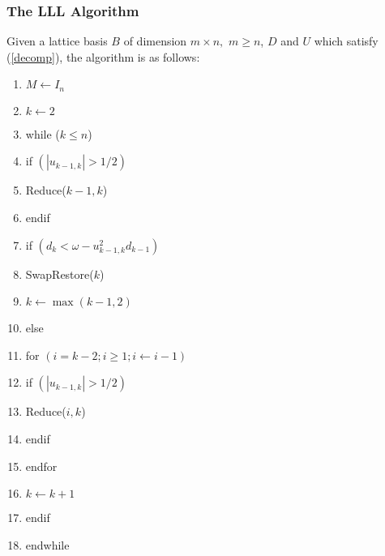 \documentclass{beamer}
\begin{document}
\begin{frame}
\frametitle{The LLL Algorithm}
Given a lattice basis $B$ of dimension $m\times n,$ $m\geq n$, $D$ and $U$ which satisfy (\ref{decomp}), the algorithm is as follows:
\begin{tiny}
\begin{enumerate}[1]
\item $M\leftarrow I_n$
\item $k\leftarrow 2$
\item while ($k\leq n$)
\item \hspace{2em} if $\left(|u_{k-1,k}|>1/2\right)$
\item \hspace{2em}\hspace{2em} Reduce($k-1,k$)
\item \hspace{2em} endif
\item \hspace{2em} if $\left(d_k<\omega -u^2_{k-1,k}d_{k-1}\right)$
\item \hspace{2em}\hspace{2em} SwapRestore($k$)
\item \hspace{2em}\hspace{2em} $k\leftarrow\max(k-1,2)$
\item \hspace{2em} else
\item \hspace{2em}\hspace{2em} for $\left(i=k-2; i \geq 1; i\leftarrow i-1\right)$
\item \hspace{2em}\hspace{2em} \hspace{2em} if $\left(|u_{k-1,k}|>1/2\right)$
\item \hspace{2em}\hspace{2em} \hspace{2em} \hspace{2em} Reduce($i,k$)
\item \hspace{2em}\hspace{2em} \hspace{2em} endif
\item \hspace{2em}\hspace{2em} endfor
\item \hspace{2em} $k\leftarrow k+1$
\item \hspace{2em} endif
\item endwhile
\end{enumerate}
\end{tiny}
\end{frame}
\end{document}
